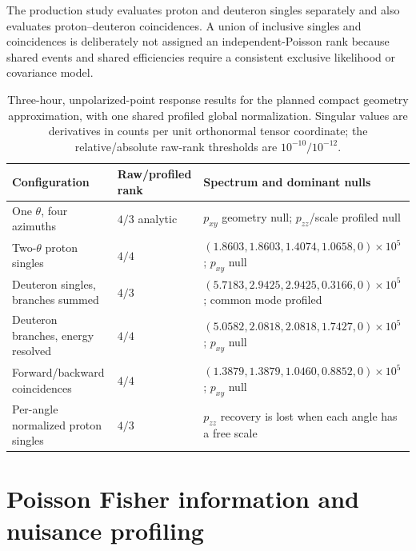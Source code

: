 \documentclass[11pt,a4paper]{article}
\begin{document}
The production study evaluates proton and deuteron singles separately and also
evaluates proton--deuteron coincidences.  A union of inclusive singles and
coincidences is deliberately not assigned an independent-Poisson rank because
shared events and shared efficiencies require a consistent exclusive likelihood
or covariance model.

\begin{table}[htbp]
\centering
\caption{Three-hour, unpolarized-point response results for the planned compact
geometry approximation, with one shared profiled global normalization.  Singular
values are derivatives in counts per unit orthonormal tensor coordinate; the
relative/absolute raw-rank thresholds are $10^{-10}/10^{-12}$.}
\scriptsize
\begin{tabularx}{\linewidth}{YYY}
\toprule
Configuration & Raw/profiled rank & Spectrum and dominant nulls\\
\midrule
One $\theta$, four azimuths & $4/3$ analytic & $p_{xy}$ geometry null; $p_{zz}$/scale profiled null\\
Two-$\theta$ proton singles & $4/4$ & $(1.8603,1.8603,1.4074,1.0658,0)\times10^5$; $p_{xy}$ null\\
Deuteron singles, branches summed & $4/3$ & $(5.7183,2.9425,2.9425,0.3166,0)\times10^5$; common mode profiled\\
Deuteron branches, energy resolved & $4/4$ & $(5.0582,2.0818,2.0818,1.7427,0)\times10^5$; $p_{xy}$ null\\
Forward/backward coincidences & $4/4$ & $(1.3879,1.3879,1.0460,0.8852,0)\times10^5$; $p_{xy}$ null\\
Per-angle normalized proton singles & $4/3$ & $p_{zz}$ recovery is lost when each angle has a free scale\\
\bottomrule
\end{tabularx}
\label{tab:scenario-ranks}
\end{table}

\section{Poisson Fisher information and nuisance profiling}
\end{document}
